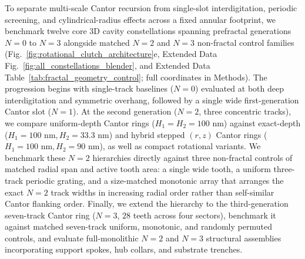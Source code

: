\documentclass[pdflatex,sn-nature]{sn-jnl}
\begin{document}
To separate multi-scale Cantor recursion from single-slot interdigitation, periodic screening, and cylindrical-radius effects across a fixed annular footprint, we benchmark twelve core 3D cavity constellations spanning prefractal generations $N=0$ to $N=3$ alongside matched $N=2$ and $N=3$ non-fractal control families (Fig.~\ref{fig:rotational_clutch_architecture}e, Extended Data Fig.~\ref{fig:all_constellations_blender}, and Extended Data Table~\ref{tab:fractal_geometry_control}; full coordinates in Methods). The progression begins with single-track baselines ($N=0$) evaluated at both deep interdigitation and symmetric overhang, followed by a single wide first-generation Cantor slot ($N=1$). At the second generation ($N=2$, three concentric tracks), we compare uniform-depth Cantor rings ($H_1 = H_2 = 100\text{ nm}$) against exact-depth ($H_1 = 100\text{ nm}, H_2 = 33.3\text{ nm}$) and hybrid stepped $(r,z)$ Cantor rings ($H_1 = 100\text{ nm}, H_2 = 90\text{ nm}$), as well as compact rotational variants. We benchmark these $N=2$ hierarchies directly against three non-fractal controls of matched radial span and active tooth area: a single wide tooth, a uniform three-track periodic grating, and a size-matched monotonic array that arranges the exact $N=2$ track widths in increasing radial order rather than self-similar Cantor flanking order. Finally, we extend the hierarchy to the third-generation seven-track Cantor ring ($N=3$, $28$ teeth across four sectors), benchmark it against matched seven-track uniform, monotonic, and randomly permuted controls, and evaluate full-monolithic $N=2$ and $N=3$ structural assemblies incorporating support spokes, hub collars, and substrate trenches.
\end{document}
